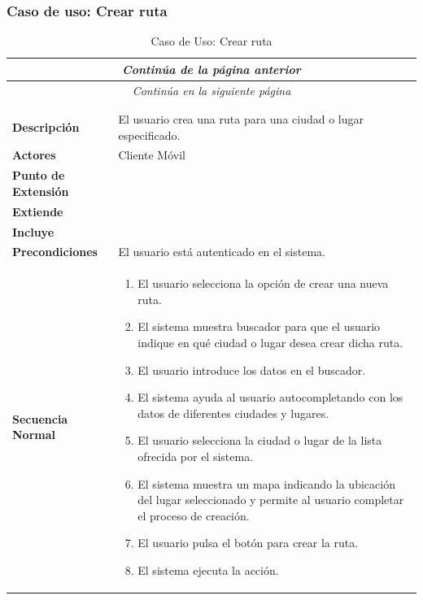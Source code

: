 \subsubsection*{Caso de uso: Crear ruta}
\begin{longtable}{| p{4cm} | p{10cm} |}
\endfirsthead
\multicolumn{2}{c}{\textit{Continúa de la página anterior}}\\[12pt]
\hline
\endhead
\hline
\multicolumn{2}{c}{\textit{Continúa en la siguiente página}} \\
\endfoot
\hline
\caption{Caso de Uso: Crear ruta}\label{fig:1}\\
\endlastfoot


\hline
\multicolumn{2}{|c|}{\textbf{CU$<$03$>$ - Crear Ruta}} \\

\hline
\textbf{Descripción} &
El usuario crea una ruta para una ciudad o lugar especificado. \\

\hline
\textbf{Actores} &
Cliente Móvil\\

\hline
\textbf{Punto de Extensión} &
\\

\hline
\textbf{Extiende} &
\\

\hline
\textbf{Incluye} &
\\

\hline
\textbf{Precondiciones} &
El usuario está autenticado en el sistema.\\

\hline
\textbf{Secuencia Normal} &\mbox{}\par\vspace{-\baselineskip}
\begin{enumerate}[leftmargin=0.7cm, topsep=0.1cm]
\item El usuario selecciona la opción de crear una nueva ruta.
\item El sistema muestra buscador para que el usuario indique en qué ciudad o lugar desea crear dicha ruta.
\item El usuario introduce los datos en el buscador.
\item El sistema ayuda al usuario autocompletando con los datos de diferentes ciudades y lugares.
\item El usuario selecciona la ciudad o lugar de la lista ofrecida por el sistema.
\item El sistema muestra un mapa indicando la ubicación del lugar seleccionado y permite al usuario completar el proceso de creación.
\item El usuario pulsa el botón para crear la ruta.
\item El sistema ejecuta la acción.
\end{enumerate}\\


\end{longtable}
